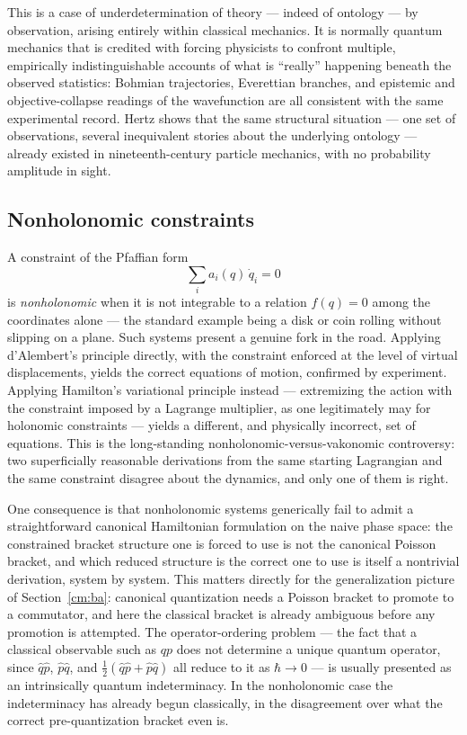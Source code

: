 This is a case of underdetermination of theory --- indeed of ontology --- by
observation, arising entirely within classical mechanics. It is normally quantum
mechanics that is credited with forcing physicists to confront multiple,
empirically indistinguishable accounts of what is ``really'' happening beneath
the observed statistics: Bohmian trajectories, Everettian branches, and
epistemic and objective-collapse readings of the wavefunction are all consistent
with the same experimental record. Hertz shows that the same structural
situation --- one set of observations, several inequivalent stories about the
underlying ontology --- already existed in nineteenth-century particle mechanics,
with no probability amplitude in sight.

\subsection{Nonholonomic constraints }

A constraint of the Pfaffian form
\begin{equation}
  \sum_i a_i(q)\,\dot q_i = 0
\end{equation}
is \emph{nonholonomic} when it is not integrable to a relation $f(q)=0$ among the
coordinates alone --- the standard example being a disk or coin rolling without
slipping on a plane. Such systems present a genuine fork in the road. Applying
d'Alembert's principle directly, with the constraint enforced at the level of
virtual displacements, yields the correct equations of motion, confirmed by
experiment. Applying Hamilton's variational principle instead --- extremizing the
action with the constraint imposed by a Lagrange multiplier, as one legitimately
may for holonomic constraints --- yields a different, and physically incorrect,
set of equations. This is the long-standing nonholonomic-versus-vakonomic
controversy: two superficially reasonable derivations from the same starting
Lagrangian and the same constraint disagree about the dynamics, and only one of
them is right.

One consequence is that nonholonomic systems generically fail to admit a
straightforward canonical Hamiltonian formulation on the naive phase space:
the constrained bracket structure one is forced to use is not the canonical
Poisson bracket, and which reduced structure is the correct one to use is itself
a nontrivial derivation, system by system. This matters directly for the
generalization picture of Section~\ref{cm:ba}: canonical quantization
needs a Poisson bracket to promote to a commutator, and here the classical
bracket is already ambiguous before any promotion is attempted. The
operator-ordering problem --- the fact that a classical observable such as $qp$
does not determine a unique quantum operator, since $\hat q\hat p$, $\hat p\hat
q$, and $\tfrac12(\hat q\hat p+\hat p\hat q)$ all reduce to it as $\hbar\to0$
--- is usually presented as an intrinsically quantum indeterminacy. In the
nonholonomic case the indeterminacy has already begun classically, in the
disagreement over what the correct pre-quantization bracket even is.

